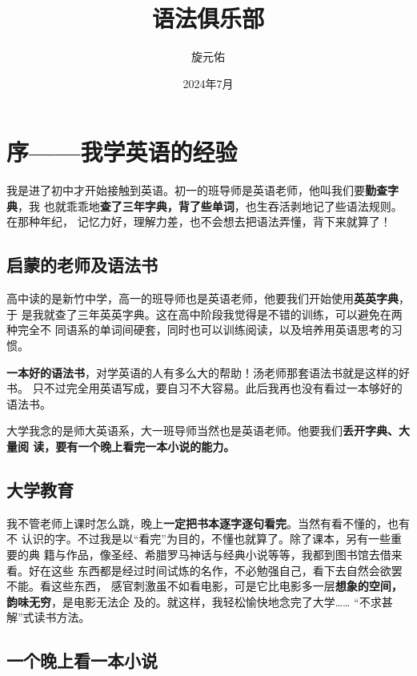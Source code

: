 \documentclass{yufa}
\title{语法俱乐部}
\author{旋元佑}
\date{2024年7月}
\begin{document}

\frontmatter
\maketitle

\tableofcontents

\chapter{序——我学英语的经验}

我是进了初中才开始接触到英语。初一的班导师是英语老师，他叫我们要\textbf{勤查字典}，我
也就乖乖地\textbf{查了三年字典，背了些单词}，也生吞活剥地记了些语法规则。在那种年纪，
记忆力好，理解力差，也不会想去把语法弄懂，背下来就算了！

\section*{启蒙的老师及语法书}

高中读的是新竹中学，高一的班导师也是英语老师，他要我们开始使用\textbf{英英字典}，于
是我就查了三年英英字典。这在高中阶段我觉得是不错的训练，可以避免在两种完全不
同语系的单词间硬套，同时也可以训练阅读，以及培养用英语思考的习惯。

\textbf{一本好的语法书}，对学英语的人有多么大的帮助！汤老师那套语法书就是这样的好书。
只不过完全用英语写成，要自习不大容易。此后我再也没有看过一本够好的语法书。

大学我念的是师大英语系，大一班导师当然也是英语老师。他要我们\textbf{丢开字典、大量阅
  读，要有一个晚上看完一本小说的能力。}

\section*{大学教育}

我不管老师上课时怎么跳，晚上\textbf{一定把书本逐字逐句看完}。当然有看不懂的，也有不
认识的字。不过我是以“看完”为目的，不懂也就算了。除了课本，另有一些重要的典
籍与作品，像圣经、希腊罗马神话与经典小说等等，我都到图书馆去借来看。好在这些
东西都是经过时间试炼的名作，不必勉强自己，看下去自然会欲罢不能。看这些东西，
感官刺激虽不如看电影，可是它比电影多一层\textbf{想象的空间，韵味无穷}，是电影无法企
及的。就这样，我轻松愉快地念完了大学…… “不求甚解”式读书方法。

\section*{一个晚上看一本小说}
\end{document}
